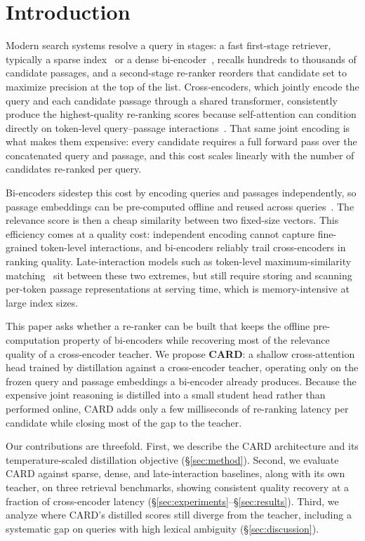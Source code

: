 \section{Introduction}
\label{sec:intro}

Modern search systems resolve a query in stages: a fast first-stage
retriever, typically a sparse index~\cite{kessler2021fusion} or a dense
bi-encoder~\cite{aldana2020dpr}, recalls hundreds to thousands of candidate
passages, and a second-stage re-ranker reorders that candidate set to
maximize precision at the top of the list. Cross-encoders, which jointly
encode the query and each candidate passage through a shared transformer,
consistently produce the highest-quality re-ranking scores because
self-attention can condition directly on token-level query--passage
interactions~\cite{marchetti2020monobert}. That same joint encoding is what
makes them expensive: every candidate requires a full forward pass over the
concatenated query and passage, and this cost scales linearly with the
number of candidates re-ranked per query.

Bi-encoders sidestep this cost by encoding queries and passages
independently, so passage embeddings can be pre-computed offline and reused
across queries~\cite{aldana2020dpr}. The relevance score is then a cheap
similarity between two fixed-size vectors. This efficiency comes at a
quality cost: independent encoding cannot capture fine-grained token-level
interactions, and bi-encoders reliably trail cross-encoders in ranking
quality. Late-interaction models such as token-level maximum-similarity
matching~\cite{solheim2020late} sit between these two extremes, but still
require storing and scanning per-token passage representations at serving
time, which is memory-intensive at large index sizes.

This paper asks whether a re-ranker can be built that keeps the offline
pre-computation property of bi-encoders while recovering most of the
relevance quality of a cross-encoder teacher. We propose \textbf{CARD}: a
shallow cross-attention head trained by distillation against a cross-encoder
teacher, operating only on the frozen query and passage embeddings a
bi-encoder already produces. Because the expensive joint reasoning is
distilled into a small student head rather than performed online, CARD adds
only a few milliseconds of re-ranking latency per candidate while closing
most of the gap to the teacher.

Our contributions are threefold. First, we describe the CARD architecture
and its temperature-scaled distillation objective
(\S\ref{sec:method}). Second, we evaluate CARD against sparse, dense, and
late-interaction baselines, along with its own teacher, on three retrieval
benchmarks, showing consistent quality recovery at a fraction of
cross-encoder latency (\S\ref{sec:experiments}--\S\ref{sec:results}). Third,
we analyze where CARD's distilled scores still diverge from the teacher,
including a systematic gap on queries with high lexical ambiguity
(\S\ref{sec:discussion}).
